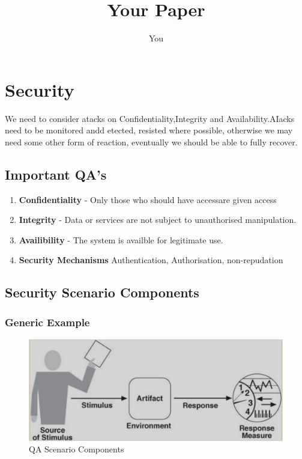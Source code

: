 \documentclass[a4paper]{report}
\title{Your Paper}
\author{You}
\begin{document}
\maketitle
\tableofcontents






\chapter{Security}
We need to consider atacks on Confidentiality,Integrity and Availability.AIacks need to be monitored andd etected, resisted where possible, otherwise we may need some other form of reaction, eventually we should be able to fully recover.
\section{Important QA's}
\begin{enumerate}
\item \textbf{Confidentiality} - Only those who should have accessare given access
\item \textbf{Integrity} -  Data or services are not subject to unauthorised manipulation.
\item \textbf{Availibility} -  The system is availble for legitimate use.
\item \textbf{Security Mechanisms} Authentication, Authorisation, non-repudation
\end{enumerate}

\section{Security Scenario Components}
\subsection{Generic Example}
\begin{figure}[h]
\centering 
\includegraphics[scale=0.3]{aimages/genreralqascenario.png}
\caption{\label{tab:widgets} QA Scenario Components}
\end{figure}
\end{document}
